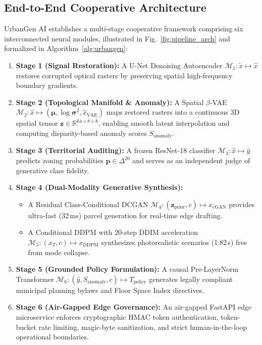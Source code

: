 \documentclass[journal]{IEEEtran}
\begin{document}
\subsection{End-to-End Cooperative Architecture}
UrbanGen AI establishes a multi-stage cooperative framework comprising six interconnected neural modules, illustrated in Fig.~\ref{fig:pipeline_arch} and formalized in Algorithm~\ref{alg:urbangen}:
\begin{enumerate}
    \item \textbf{Stage 1 (Signal Restoration):} A U-Net Denoising Autoencoder $\mathcal{M}_1: \tilde{x} \mapsto \hat{x}$ restores corrupted optical rasters by preserving spatial high-frequency boundary gradients.
    \item \textbf{Stage 2 (Topological Manifold \& Anomaly):} A Spatial $\beta$-VAE $\mathcal{M}_2: \hat{x} \mapsto (\bm{\mu}, \log\bm{\sigma}^2, \hat{x}_{\text{VAE}})$ maps restored rasters into a continuous 3D spatial tensor $\mathbf{z} \in \mathbb{R}^{64 \times 8 \times 8}$, enabling smooth latent interpolation and computing disparity-based anomaly scores $S_{\text{anomaly}}$.
    \item \textbf{Stage 3 (Territorial Auditing):} A frozen ResNet-18 classifier $\mathcal{M}_3: \hat{x} \mapsto \hat{y}$ predicts zoning probabilities $\mathbf{p} \in \Delta^{20}$ and serves as an independent judge of generative class fidelity.
    \item \textbf{Stage 4 (Dual-Modality Generative Synthesis):} 
    \begin{itemize}
        \item A Residual Class-Conditional DCGAN $\mathcal{M}_4: (\mathbf{z}_{\text{prior}}, c) \mapsto x_{\text{cGAN}}$ provides ultra-fast (32\,ms) parcel generation for real-time edge drafting.
        \item A Conditional DDPM with 20-step DDIM acceleration $\mathcal{M}_5: (x_T, c) \mapsto x_{\text{DDPM}}$ synthesizes photorealistic scenarios (1.82\,s) free from mode collapse.
    \end{itemize}
    \item \textbf{Stage 5 (Grounded Policy Formulation):} A causal Pre-LayerNorm Transformer $\mathcal{M}_6: (\hat{y}, S_{\text{anomaly}}, c) \mapsto T_{\text{policy}}$ generates legally compliant municipal planning bylaws and Floor Space Index directives.
    \item \textbf{Stage 6 (Air-Gapped Edge Governance):} An air-gapped FastAPI edge microservice enforces cryptographic HMAC token authentication, token-bucket rate limiting, magic-byte sanitization, and strict human-in-the-loop operational boundaries.
\end{enumerate}
\end{document}
